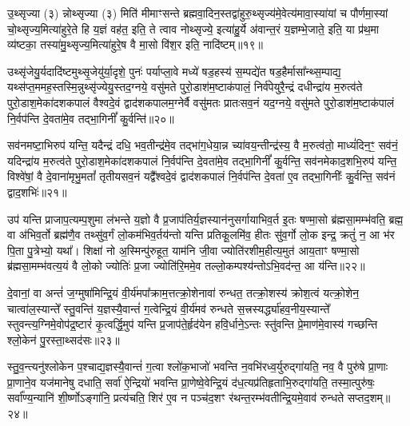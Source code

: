 {\anuvakamend[{उ॒दच॒त्युद्ये\-ऽह॑रा॒प्त्वा पञ्च॑दश च॥६॥}]}

उ॒थ्सृज्या (३) न्नोथ्सृज्या (३) मिति॑ मीमाꣳसन्ते ब्रह्मवा॒दिन॒स्तद्वा॑हुरु॒थ्सृज्य॑मे॒वेत्य॑मावा॒स्या॑यां च पौर्णमा॒स्यां चो॒थ्सृज्य॒मित्या॑हुरे॒ते हि य॒ज्ञं वह॑त॒ इति॒ ते त्वाव नोथ्सृज्ये॒ इत्या॑हु॒र्ये अ॑वान्त॒रं य॒ज्ञम्भे॒जाते॒ इति॒ या प्र॑थ॒मा व्य॑ष्टका॒ तस्या॑मु॒थ्सृज्य॒मित्या॑हुरे॒ष वै मा॒सो वि॑श॒र इति॒ नादि॑ष्टम्॥१९॥

उथ्सृ॑जेयु॒र्यदादि॑ष्टमुथ्सृ॒जेयु॑र्या॒दृशे॒ पुनः॑ पर्याप्ला॒वे मध्ये॑ षड॒हस्य॑ स॒म्पद्ये॑त षड॒हैर्मासा᳚न्थ्स॒म्पाद्य॒ यथ्स॑प्त॒ममह॒\-स्तस्मि॒न्नुथ्सृ॑ज्येयु॒स्तद॒ग्नये॒ वसु॑मते पुरो॒डाश॑म॒ष्टाक॑पालं॒ निर्व॑पेयुरै॒न्द्रं दधीन्द्रा॑य म॒रुत्व॑ते पुरो॒डाश॒मेका॑दशकपालं वैश्वदे॒वं द्वाद॑शकपालम॒ग्नेर्वै वसु॑मतः प्रातःसव॒नं यद॒ग्नये॒ वसु॑मते पुरो॒डाश॑म॒ष्टाक॑पालं नि॒र्वप॑न्ति दे॒वता॑मे॒व तद्भा॒गिनीं᳚ कु॒र्वन्ति॑॥२०॥

सव॑नमष्टा॒भिरुप॑ यन्ति॒ यदैन्द्रं दधि॒ भव॒तीन्द्र॑मे॒व तद्भा॑ग॒धेया॒न्न च्या॑वय॒न्तीन्द्र॑स्य॒ वै म॒रुत्व॑तो॒ माध्यं॑दिन॒ꣳ॒ सव॑नं॒ यदिन्द्रा॑य म॒रुत्व॑ते पुरो॒डाश॒मेका॑दशकपालं नि॒र्वप॑न्ति दे॒वता॑मे॒व तद्भा॒गिनीं᳚ कु॒र्वन्ति॒ सव॑नमेकाद॒शभि॒रुप॑ यन्ति॒ विश्वे॑षां॒ वै दे॒वाना॑मृभु॒मतां᳚ तृतीयसव॒नं यद्वै᳚श्वदे॒वं द्वाद॑शकपालं नि॒र्वप॑न्ति दे॒वता॑ ए॒व तद्भा॒गिनीः᳚ कु॒र्वन्ति॒ सव॑नं द्वाद॒शभिः॑॥२१॥

उप॑ यन्ति प्राजाप॒त्यम्प॒शुमा ल॑भन्ते य॒ज्ञो वै प्र॒जाप॑तिर्य॒ज्ञस्यान॑नुसर्गायाभिव॒र्त इ॒तः षण्मा॒सो ब्र॑ह्मसा॒मम्भ॑वति॒ ब्रह्म॒ वा अ॑भिव॒र्तो ब्रह्म॑णै॒व तथ्सु॑व॒र्गं लो॒कम॑भिव॒र्तय॑न्तो यन्ति प्रतिकू॒लमि॑व॒ हीतः सु॑व॒र्गो लो॒क इन्द्र॒ क्रतुं॑ न॒ आ भ॑र पि॒ता पु॒त्रेभ्यो॒ यथा᳚। शिक्षा॑ नो अ॒स्मिन्पु॑रुहूत॒ याम॑नि जी॒वा ज्योति॑रशीम॒हीत्य॒मुत॑ आय॒ताꣳ षण्मा॒सो ब्र॑ह्मसा॒मम्भ॑वत्य॒यं वै लो॒को ज्योतिः॑ प्र॒जा ज्योति॑रि॒ममे॒व तल्लो॒कम्पश्य॑न्तो\-ऽभि॒वद॑न्त॒ आ य॑न्ति॥२२॥

{\anuvakamend[{नादि॑ष्टङ्कु॒र्वन्ति॑ द्वाद॒शभि॒रिति॑ विꣳश॒तिश्च॑॥७॥}]}

दे॒वानां॒ वा अन्तं॑ ज॒ग्मुषा॑मिन्द्रि॒यं वी॒र्य॑मपा᳚क्राम॒त्तत्क्रो॒शेनावा॑ रुन्धत॒ तत्क्रो॒शस्य॑ क्रोश॒त्वं यत्क्रो॒शेन॒ चात्वा॑ल॒स्यान्ते᳚ स्तु॒वन्ति॑ य॒ज्ञस्यै॒वान्तं॑ ग॒त्वेन्द्रि॒यं वी॒र्य॑मव॑ रुन्धते स॒त्त्रस्यर्द्ध्या॑हव॒नीय॒स्यान्ते᳚ स्तुवन्त्य॒ग्निमे॒वोप॑द्र॒ष्टारं॑ कृ॒त्वर्द्धि॒मुप॑ यन्ति प्र॒जाप॑ते॒र्\mbox{}हृद॑येन हवि॒र्धाने॒\-ऽन्तः स्तु॑वन्ति प्रे॒माण॑मे॒वास्य॑ गच्छन्ति श्लो॒केन॑ पु॒रस्ता॒थ्सद॑सः॥२३॥

स्तु॒व॒न्त्यनु॑श्लोकेन प॒श्चाद्य॒ज्ञस्यै॒वान्तं॑ ग॒त्वा श्लो॑क॒भाजो॑ भवन्ति न॒वभि॑रध्व॒र्युरुद्गा॑यति॒ नव॒ वै पुरु॑षे प्रा॒णाः प्रा॒णाने॒व यज॑मानेषु दधाति॒ सर्वा॑ ऐ॒न्द्रियो॑ भवन्ति प्रा॒णेष्वे॒वेन्द्रि॒यं द॑ध॒त्यप्र॑तिहृताभि॒रुद्गा॑यति॒ तस्मा॒त्पुरु॑षः॒ सर्वा᳚ण्य॒न्यानि॑ शी॒र्ष्णो\-ऽङ्गा॑नि॒ प्रत्य॑चति॒ शिर॑ ए॒व न पञ्च॑द॒शꣳ र॑थन्त॒रम्भ॑वतीन्द्रि॒यमे॒वाव॑ रुन्धते सप्तद॒शम्॥२४॥

